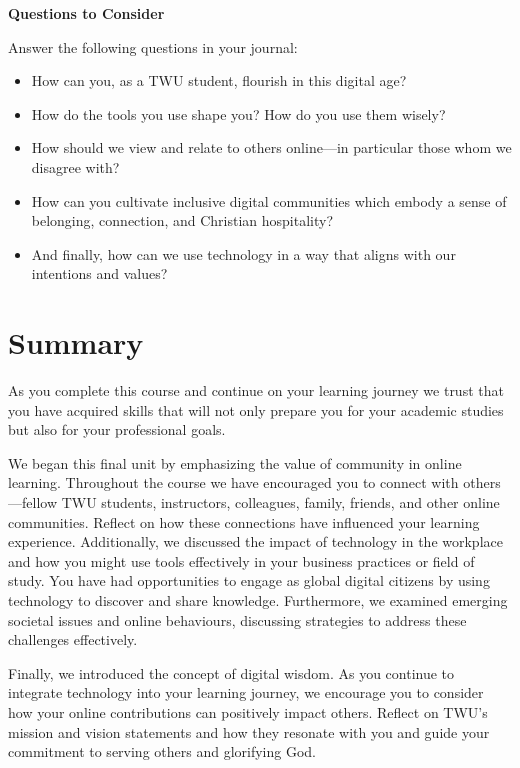 \documentclass[
  letterpaper,
  DIV=11,
  numbers=noendperiod]{scrreprt}
\providecommand{\tightlist}{%
  \setlength{\itemsep}{0pt}\setlength{\parskip}{0pt}}\usepackage{longtable,booktabs,array}
\begin{document}
\begin{tcolorbox}
\textbf{Questions to Consider}

Answer the following questions in your journal:

\begin{itemize}
\tightlist
\item
  How can you, as a TWU student, flourish in this digital age?
\item
  How do the tools you use shape you? How do you use them wisely?
\item
  How should we view and relate to others online---in particular those
  whom we disagree with?
\item
  How can you cultivate inclusive digital communities which embody a
  sense of belonging, connection, and Christian hospitality?
\item
  And finally, how can we use technology in a way that aligns with our
  intentions and values?
\end{itemize}

\end{tcolorbox}

\section{Summary}\label{summary-5}

As you complete this course and continue on your learning journey we
trust that you have acquired skills that will not only prepare you for
your academic studies but also for your professional goals.

We began this final unit by emphasizing the value of community in online
learning. Throughout the course we have encouraged you to connect with
others---fellow TWU students, instructors, colleagues, family, friends,
and other online communities. Reflect on how these connections have
influenced your learning experience. Additionally, we discussed the
impact of technology in the workplace and how you might use tools
effectively in your business practices or field of study. You have had
opportunities to engage as global digital citizens by using technology
to discover and share knowledge. Furthermore, we examined emerging
societal issues and online behaviours, discussing strategies to address
these challenges effectively.

Finally, we introduced the concept of digital wisdom. As you continue to
integrate technology into your learning journey, we encourage you to
consider how your online contributions can positively impact others.
Reflect on TWU's mission and vision statements and how they resonate
with you and guide your commitment to serving others and glorifying God.
\end{document}
